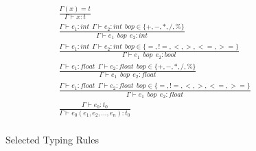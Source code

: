

\begin{figure}[ht!]
\centering
\tiny
\begin{minipage}{0.45\columnwidth}
\centering
\begin{align*}
  \tag{T-VARIABLE}
  &\frac
  {\Gamma(x)=t}
  {\Gamma \vdash x:t}\\
  \tag{T-INT ARITH}
  &\frac
  {\Gamma \vdash e_1:int ~~ \Gamma \vdash e_2:int ~~ bop \in \{+,-,*,/,\%\}}
  {\Gamma \vdash e_1 ~~ bop ~~ e_2 :int} \\
  \tag{T-INT REL}
  &\frac
  {\Gamma \vdash e_1:int ~~ \Gamma \vdash e_2:int ~~ bop \in \{=, !=, <, >, <=, >=\}}
  {\Gamma \vdash e_1 ~~ bop ~~ e_2 :bool} \\
  \tag{T-FLOAT ARITH}
  &\frac
  {\Gamma \vdash e_1:float ~~ \Gamma \vdash e_2:float ~~ bop \in \{+,-,*,/,\%\}}
  {\Gamma \vdash e_1 ~~ bop ~~ e_2 :float}\\
  \tag{T-FLOAT REL}
  &\frac
  {\Gamma \vdash e_1:float ~~ \Gamma \vdash e_2:float ~~ bop \in \{=, !=, <, >, <=, >=\}}
  {\Gamma \vdash e_1 ~~ bop ~~ e_2 :float}\\
  \tag{T-CONSTRAINT}
  &\frac
  {\Gamma \vdash e_0:t_0}
  {\Gamma \vdash e_0(e_1, e_2, ..., e_n):t_0}\\
  \end{align*}
 \end{minipage}
\caption{Selected Typing Rules}\label{fig:typingrule}
\end{figure}
